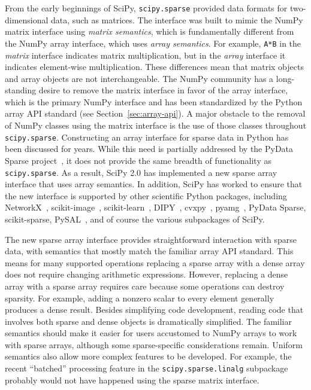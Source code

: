 \documentclass[acmsmall]{acmart}
\begin{document}
From the early beginnings of SciPy, \texttt{scipy.sparse} provided data formats
for two-dimensional data, such as matrices. The interface was built to mimic
the NumPy matrix interface using \emph{matrix semantics}, which is fundamentally
different from the NumPy array interface, which uses \emph{array semantics}.
For example, \texttt{A*B} in the \emph{matrix} interface
indicates matrix multiplication,
but in the \emph{array} interface it indicates element-wise multiplication.
These differences mean that matrix objects and array objects are not interchangeable.
The NumPy community has a long-standing desire to remove the matrix interface
in favor of the array interface, which is the primary NumPy interface and has been
standardized by the Python array API standard (see Section~\ref{sec:array-api}).
A major obstacle to the removal of NumPy classes using the matrix interface is
the use of those classes throughout \texttt{scipy.sparse}.
Constructing an array interface for sparse data in Python has been discussed for years.
While this need is partially addressed by the PyData Sparse
project~\cite{Abbasi2018}, it does not provide the
same breadth of functionality as \texttt{scipy.sparse}. As a result, SciPy 2.0 has
implemented a new sparse array interface that uses array semantics. In addition, SciPy
has worked to ensure that the new interface is supported by other scientific
Python packages, including NetworkX~\cite{Hagberg2008}, scikit-image~\cite{vanderWalt2014},
scikit-learn~\cite{scikit-learn,sklearn_api}, DIPY~\cite{Garyfallidis2014},
cvxpy~\cite{Diamond2016,Agrawal2018}, pyamg~\cite{Bell2023}, PyData Sparse, scikit-sparse,
PySAL~\cite{Rey2007}, and of course the various subpackages of SciPy.

The new sparse array interface provides straightforward interaction with sparse data,
with semantics that mostly match the familiar array API standard. This means for many
supported operations replacing a sparse array with a dense array does not require changing arithmetic
expressions. However, replacing a dense array with a sparse array requires care because
some operations can destroy sparsity. For example, adding a nonzero scalar to every
element generally produces a dense result.
Besides simplifying code development, reading
code that involves both sparse and dense objects is dramatically simplified.
The familiar semantics should make it easier for users accustomed to NumPy arrays to
work with sparse arrays, although some sparse-specific considerations remain.
Uniform semantics also allow more complex features to be developed.
For example, the recent ``batched'' processing feature in the
\texttt{scipy.sparse.linalg} subpackage probably would not have happened
using the sparse matrix interface.
\end{document}
